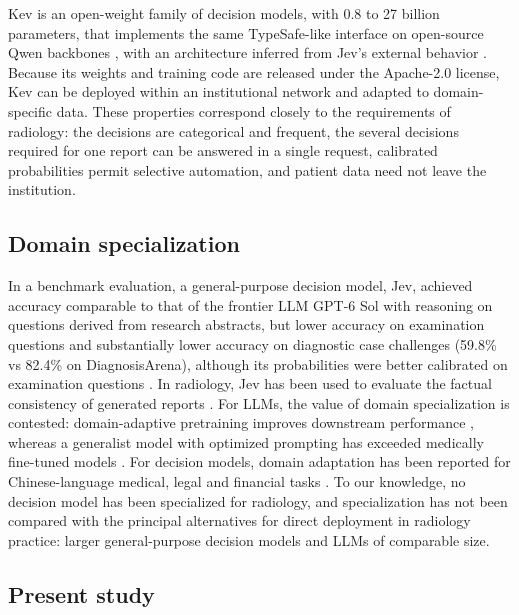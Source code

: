 \documentclass[11pt]{article}
\begin{document}
Kev is an open-weight family of decision models, with 0.8 to 27 billion parameters, that implements the same TypeSafe-like interface on open-source Qwen backbones \citep{qwen38}, with an architecture inferred from Jev's external behavior \citep{palmer2026kev,hume2026unmasked}. Because its weights and training code are released under the Apache-2.0 license, Kev can be deployed within an institutional network and adapted to domain-specific data. These properties correspond closely to the requirements of radiology: the decisions are categorical and frequent, the several decisions required for one report can be answered in a single request, calibrated probabilities permit selective automation, and patient data need not leave the institution.

\subsection{Domain specialization}\label{sec:intro_spec}

In a benchmark evaluation, a general-purpose decision model, Jev, achieved accuracy comparable to that of the frontier LLM GPT-6 Sol with reasoning on questions derived from research abstracts, but lower accuracy on examination questions and substantially lower accuracy on diagnostic case challenges (59.8\% vs 82.4\% on DiagnosisArena), although its probabilities were better calibrated on examination questions \citep{madrid2026jevmed}. In radiology, Jev has been used to evaluate the factual consistency of generated reports \citep{huang2026jevrad}. For LLMs, the value of domain specialization is contested: domain-adaptive pretraining improves downstream performance \citep{gururangan2020dontstop}, whereas a generalist model with optimized prompting has exceeded medically fine-tuned models \citep{nori2023medprompt}. For decision models, domain adaptation has been reported for Chinese-language medical, legal and financial tasks \citep{wang2026chinesejev}. To our knowledge, no decision model has been specialized for radiology, and specialization has not been compared with the principal alternatives for direct deployment in radiology practice: larger general-purpose decision models and LLMs of comparable size.

\subsection{Present study}\label{sec:intro_study}
\end{document}
